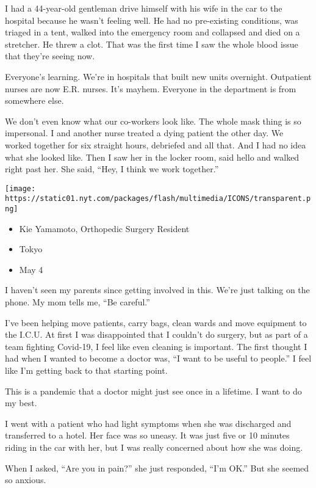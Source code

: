 I had a 44-year-old gentleman drive himself with his wife in the car to
the hospital because he wasn't feeling well. He had no pre-existing
conditions, was triaged in a tent, walked into the emergency room and
collapsed and died on a stretcher. He threw a clot. That was the first
time I saw the whole blood issue that they're seeing now.

Everyone's learning. We're in hospitals that built new units overnight.
Outpatient nurses are now E.R. nurses. It's mayhem. Everyone in the
department is from somewhere else.

We don't even know what our co-workers look like. The whole mask thing
is so impersonal. I and another nurse treated a dying patient the other
day. We worked together for six straight hours, debriefed and all that.
And I had no idea what she looked like. Then I saw her in the locker
room, said hello and walked right past her. She said, ``Hey, I think we
work together.''

\texttt{[image: https://static01.nyt.com/packages/flash/multimedia/ICONS/transparent.png]}

\begin{itemize}
\tightlist
\item
  Kie Yamamoto, Orthopedic Surgery Resident
\item
  Tokyo
\item
  May 4
\end{itemize}

I haven't seen my parents since getting involved in this. We're just
talking on the phone. My mom tells me, ``Be careful.''

I've been helping move patients, carry bags, clean wards and move
equipment to the I.C.U. At first I was disappointed that I couldn't do
surgery, but as part of a team fighting Covid-19, I feel like even
cleaning is important. The first thought I had when I wanted to become a
doctor was, ``I want to be useful to people.'' I feel like I'm getting
back to that starting point.

This is a pandemic that a doctor might just see once in a lifetime. I
want to do my best.

I went with a patient who had light symptoms when she was discharged and
transferred to a hotel. Her face was so uneasy. It was just five or 10
minutes riding in the car with her, but I was really concerned about how
she was doing.

When I asked, ``Are you in pain?'' she just responded, ``I'm OK.'' But
she seemed so anxious.

